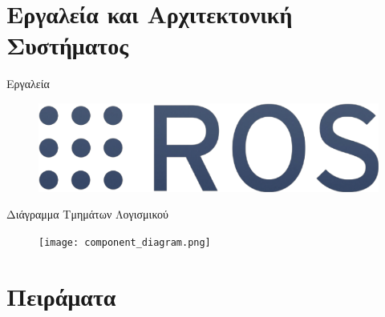 \documentclass[10pt, compress]{beamer}
\begin{document}
\section{Εργαλεία και Αρχιτεκτονική Συστήματος}

\begin{frame}{Εργαλεία}
	\begin{figure}
		\includegraphics[width=0.4\linewidth]{Figures/ros.png}\\[0.5cm]
	\end{figure}
\end{frame}

\begin{frame}{Διάγραμμα Τμημάτων Λογισμικού}
	\begin{figure}
		\texttt{[image: component\_diagram.png]}
	\end{figure}
\end{frame}

\section{Πειράματα}
\end{document}
